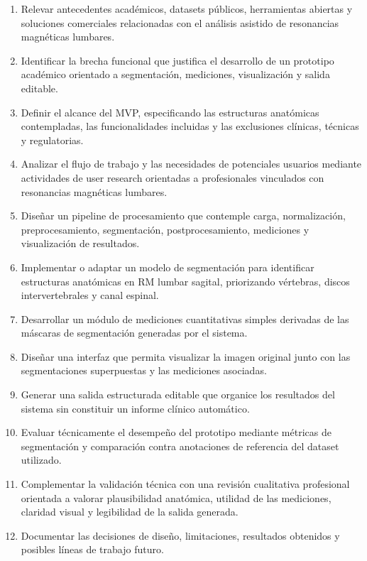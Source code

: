 \begin{enumerate}
    \item Relevar antecedentes acad\'emicos, datasets p\'ublicos, herramientas abiertas y soluciones comerciales relacionadas con el an\'alisis asistido de resonancias magn\'eticas lumbares.
    \item Identificar la brecha funcional que justifica el desarrollo de un prototipo acad\'emico orientado a segmentaci\'on, mediciones, visualizaci\'on y salida editable.
    \item Definir el alcance del MVP, especificando las estructuras anat\'omicas contempladas, las funcionalidades incluidas y las exclusiones cl\'inicas, t\'ecnicas y regulatorias.
    \item Analizar el flujo de trabajo y las necesidades de potenciales usuarios mediante actividades de user research orientadas a profesionales vinculados con resonancias magn\'eticas lumbares.
    \item Dise\~nar un pipeline de procesamiento que contemple carga, normalizaci\'on, preprocesamiento, segmentaci\'on, postprocesamiento, mediciones y visualizaci\'on de resultados.
    \item Implementar o adaptar un modelo de segmentaci\'on para identificar estructuras anat\'omicas en RM lumbar sagital, priorizando v\'ertebras, discos intervertebrales y canal espinal.
    \item Desarrollar un m\'odulo de mediciones cuantitativas simples derivadas de las m\'ascaras de segmentaci\'on generadas por el sistema.
    \item Dise\~nar una interfaz que permita visualizar la imagen original junto con las segmentaciones superpuestas y las mediciones asociadas.
    \item Generar una salida estructurada editable que organice los resultados del sistema sin constituir un informe cl\'inico autom\'atico.
    \item Evaluar t\'ecnicamente el desempe\~no del prototipo mediante m\'etricas de segmentaci\'on y comparaci\'on contra anotaciones de referencia del dataset utilizado.
    \item Complementar la validaci\'on t\'ecnica con una revisi\'on cualitativa profesional orientada a valorar plausibilidad anat\'omica, utilidad de las mediciones, claridad visual y legibilidad de la salida generada.
    \item Documentar las decisiones de dise\~no, limitaciones, resultados obtenidos y posibles l\'ineas de trabajo futuro.
\end{enumerate}
